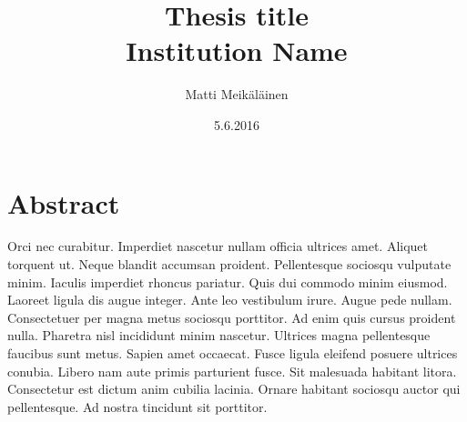 \documentclass[12pt]{report}
\title{
	{Thesis title}\\
	{\large Institution Name}\\
}
\author{Matti Meikäläinen}
\date{5.6.2016}
\begin{document}
	\maketitle
	
	\chapter*{Abstract}
	Orci nec curabitur. Imperdiet nascetur nullam officia ultrices amet. Aliquet torquent ut.
Neque blandit accumsan proident. Pellentesque sociosqu vulputate minim. Iaculis imperdiet rhoncus pariatur. Quis dui commodo minim eiusmod. Laoreet ligula dis augue integer.
Ante leo vestibulum irure. Augue pede nullam. Consectetuer per magna metus sociosqu porttitor. Ad enim quis cursus proident nulla. Pharetra nisl incididunt minim nascetur.
Ultrices magna pellentesque faucibus sunt metus. Sapien amet occaecat. Fusce ligula eleifend posuere ultrices conubia. Libero nam aute primis parturient fusce.
Sit malesuada habitant litora. Consectetur est dictum anim cubilia lacinia. Ornare habitant sociosqu auctor qui pellentesque. Ad nostra tincidunt sit porttitor.
	
	\tableofcontents
	
	
	
	
	
\end{document}
